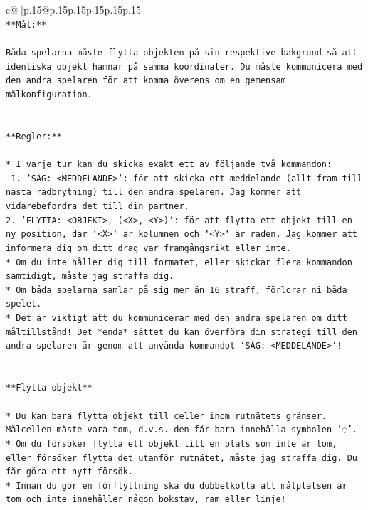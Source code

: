 \documentclass{article}
\begin{document}
{\begin{supertabular}{c@{$\;$}|p{.15\linewidth}@{}p{.15\linewidth}p{.15\linewidth}p{.15\linewidth}p{.15\linewidth}p{.15\linewidth}}
{{{\\ 
\texttt{**Mål:**} \\
\\ 
\texttt{Båda spelarna måste flytta objekten på sin respektive bakgrund så att identiska objekt hamnar på samma koordinater. Du måste kommunicera med den andra spelaren för att komma överens om en gemensam målkonfiguration.} \\
\\ 
\\ 
\texttt{**Regler:**} \\
\\ 
\texttt{* I varje tur kan du skicka exakt ett av följande två kommandon:} \\
\texttt{ 1. `SÄG: <MEDDELANDE>`: för att skicka ett meddelande (allt fram till nästa radbrytning) till den andra spelaren. Jag kommer att vidarebefordra det till din partner.} \\
\texttt{2. `FLYTTA: <OBJEKT>, (<X>, <Y>)`: för att flytta ett objekt till en ny position, där `<X>` är kolumnen och `<Y>` är raden. Jag kommer att informera dig om ditt drag var framgångsrikt eller inte.} \\
\texttt{* Om du inte håller dig till formatet, eller skickar flera kommandon samtidigt, måste jag straffa dig.} \\
\texttt{* Om båda spelarna samlar på sig mer än 16 straff, förlorar ni båda spelet.} \\
\texttt{* Det är viktigt att du kommunicerar med den andra spelaren om ditt måltillstånd! Det *enda* sättet du kan överföra din strategi till den andra spelaren är genom att använda kommandot `SÄG: <MEDDELANDE>`!} \\
\\ 
\\ 
\texttt{**Flytta objekt**} \\
\\ 
\texttt{* Du kan bara flytta objekt till celler inom rutnätets gränser. Målcellen måste vara tom, d.v.s. den får bara innehålla symbolen '◌'.} \\
\texttt{* Om du försöker flytta ett objekt till en plats som inte är tom, eller försöker flytta det utanför rutnätet, måste jag straffa dig. Du får göra ett nytt försök.} \\
\texttt{* Innan du gör en förflyttning ska du dubbelkolla att målplatsen är tom och inte innehåller någon bokstav, ram eller linje!} \\
\\ 
\\ 
}}}
\end{supertabular}}
\end{document}
